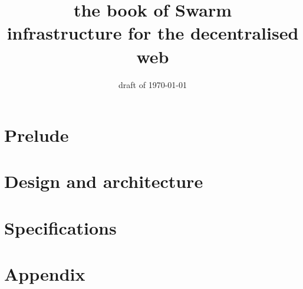 \documentclass[a4paper,12pt,fullpage,openany,hyperfootnotes,hidelinks]{scrbook}
\title{\Huge\sc the book of Swarm\\
\Large infrastructure for the decentralised web}
\author{}
\date{draft of \today}
\theoremstyle{definition}
\begin{document}
\maketitle
\setcounter{tocdepth}{2}
\tableofcontents

\listoffigures


\part{Prelude} \label{part:preface}
 

\part{Design and architecture} \label{part:designarchitecture}

\part{Specifications} \label{part:specifications}


\cite{ethersphere2016smash}
\cite{ethersphere2016sw3}
\cite{maymounkov2002kademlia}
\cite{heep2010r}
  

\appendix
\part{Appendix}


\newpage
\printglossary
\printglossary[type=\acronymtype,title={List of Acronyms}]
\end{document}
